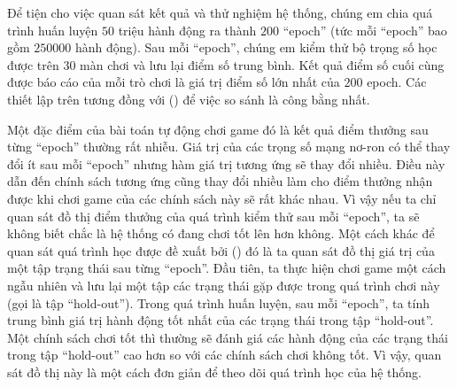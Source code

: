 	Để tiện cho việc quan sát kết quả và thử nghiệm hệ thống, chúng em chia quá trình huấn luyện $50$ triệu hành động ra thành $200$ ``epoch'' (tức mỗi ``epoch'' bao gồm $250000$ hành động).
	Sau mỗi ``epoch'', chúng em kiểm thử bộ trọng số học được trên $30$ màn chơi và lưu lại điểm số trung bình.
	Kết quả điểm số cuối cùng được báo cáo của mỗi trò chơi là giá trị điểm số lớn nhất của $200$ epoch.
	Các thiết lập trên tương đồng với (\cite{mnihdqn2015}) để việc so sánh là công bằng nhất.
	
	Một đặc điểm của bài toán tự động chơi game đó là kết quả điểm thưởng sau từng ``epoch'' thường rất nhiễu.
	Giá trị của các trọng số mạng nơ-ron có thể thay đổi ít sau mỗi ``epoch'' nhưng hàm giá trị tương ứng sẽ thay đổi nhiều.
	Điều này dẫn đến chính sách tương ứng cũng thay đổi nhiều làm cho điểm thưởng nhận được khi chơi game của các chính sách này sẽ rất khác nhau.
	Vì vậy nếu ta chỉ quan sát đồ thị điểm thưởng của quá trình kiểm thử sau mỗi ``epoch'', ta sẽ không biết chắc là hệ thống có đang chơi tốt lên hơn không.
	Một cách khác để quan sát quá trình học được đề xuất bởi (\cite{mnih2013playing}) đó là ta quan sát đồ thị giá trị của một tập trạng thái sau từng ``epoch''.
	Đầu tiên, ta thực hiện chơi game một cách ngẫu nhiên và lưu lại một tập các trạng thái gặp được trong quá trình chơi này (gọi là tập ``hold-out'').
	Trong quá trình huấn luyện, sau mỗi ``epoch'', ta tính trung bình giá trị hành động tốt nhất của các trạng thái trong tập ``hold-out''.
	Một chính sách chơi tốt thì thường sẽ đánh giá các hành động của các trạng thái trong tập ``hold-out'' cao hơn so với các chính sách chơi không tốt.
	Vì vậy, quan sát đồ thị này là một cách đơn giản để theo dõi quá trình học của hệ thống.
